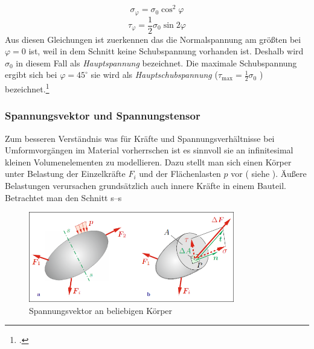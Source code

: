 \documentclass[12pt,a4paper,parskip]{scrartcl}
\begin{document}
{\begin{equation}
\sigma_{\varphi} = \sigma_0\cos^2{\varphi}
\end{equation}
\begin{equation}
\tau_{\varphi} = \frac{1}{2} \sigma_0\sin{2\varphi}
\end{equation}
Aus diesen Gleichungen ist zuerkennen das die Normalspannung am größten bei $ \varphi = 0 $ ist, weil in dem Schnitt keine Schubspannung vorhanden ist. Deshalb wird $ \sigma_0 $ in diesem Fall als \emph{Hauptspannung} bezeichnet. Die maximale Schubspannung ergibt sich bei $ \varphi = 45^{\circ} $ sie wird als \emph{Hauptschubspannung} ($ \tau_{\text{max}} = \frac{1}{2}\sigma_0 $ ) bezeichnet.\footcite[Vgl.][388]{dd}



  
\subsubsection{Spannungsvektor und Spannungstensor}
Zum besseren Verständnis was für Kräfte und Spannungsverhältnisse bei Umformvorgängen im Material vorherrschen ist es sinnvoll sie an infinitesimal kleinen Volumenelementen zu modellieren. Dazu stellt man sich einen Körper unter Belastung der Einzelkräfte $ F_i $ und der Flächenlasten $ p $  vor ( siehe ). Äußere Belastungen verursachen grundsätzlich auch innere Kräfte in einem Bauteil. Betrachtet man den Schnitt s--s \begin{figure}
  \centering
  \includegraphics[width=0.8\textwidth]{normalvektor}
  \caption[Spannungsvektor am Körper]{Spannungsvektor an beliebigen Körper\protect\footnotemark}
  \label{fig:normalvektor}
  \end{figure}
  
}
\end{document}
